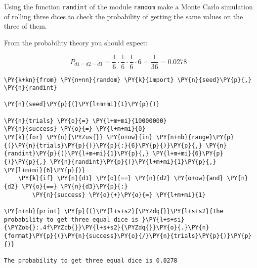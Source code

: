 \begin{Exercise}[title={(Monte Carlo Simulation I)}]
Using the function \texttt{randint} of the module \texttt{random} make a
Monte Carlo simulation of rolling three dices to check the probability
of getting the same values on the three of them.

From the probability theory you should expect:

\[P_{d1=d2=d3} = \frac{1}{6}\cdot\frac{1}{6}\cdot\frac{1}{6}\cdot 6 = \frac{1}{36} = 0.0278\]
\end{Exercise}
\begin{Answer}
\begin{tcolorbox}[size=fbox, boxrule=1pt, colback=cellbackground, colframe=cellborder]
\begin{Verbatim}[commandchars=\\\{\}]
\PY{k+kn}{from} \PY{n+nn}{random} \PY{k}{import} \PY{n}{seed}\PY{p}{,} \PY{n}{randint}
        
\PY{n}{seed}\PY{p}{(}\PY{l+m+mi}{1}\PY{p}{)}
        
\PY{n}{trials} \PY{o}{=} \PY{l+m+mi}{10000000}
\PY{n}{success} \PY{o}{=} \PY{l+m+mi}{0}
\PY{k}{for} \PY{n}{\PYZus{}} \PY{o+ow}{in} \PY{n+nb}{range}\PY{p}{(}\PY{n}{trials}\PY{p}{)}\PY{p}{:}{6}\PY{p}{)}\PY{p}{,} \PY{n}{randint}\PY{p}{(}\PY{l+m+mi}{1}\PY{p}{,} \PY{l+m+mi}{6}\PY{p}{)}\PY{p}{,} \PY{n}{randint}\PY{p}{(}\PY{l+m+mi}{1}\PY{p}{,} \PY{l+m+mi}{6}\PY{p}{)}    
    \PY{k}{if} \PY{n}{d1} \PY{o}{==} \PY{n}{d2} \PY{o+ow}{and} \PY{n}{d2} \PY{o}{==} \PY{n}{d3}\PY{p}{:}
        \PY{n}{success} \PY{o}{+}\PY{o}{=} \PY{l+m+mi}{1}
    
\PY{n+nb}{print} \PY{p}{(}\PY{l+s+s2}{\PYZdq{}}\PY{l+s+s2}{The probability to get three equal dice is }\PY{l+s+si}{\PYZob{}:.4f\PYZcb{}}\PY{l+s+s2}{\PYZdq{}}\PY{o}{.}\PY{n}{format}\PY{p}{(}\PY{n}{success}\PY{o}{/}\PY{n}{trials}\PY{p}{)}\PY{p}{)}
        
The probability to get three equal dice is 0.0278
\end{Verbatim}
\end{tcolorbox}
\end{Answer}

